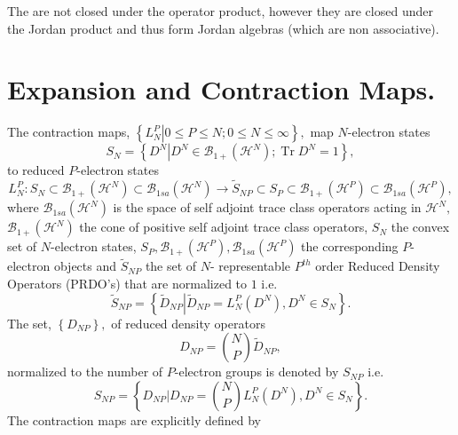 \documentclass[aps,preprint]{revtex4}%
\begin{document}
The are not closed under the operator product, however they are closed under
the Jordan product and thus form Jordan algebras (which are non associative).

\section{Expansion and Contraction Maps.}

The contraction maps, $\left\{  \left.  L_{N}^{P}\right\vert 0\leq P\leq
N;0\leq N\leq\infty\right\}  ,$ map $N$-electron states%
\begin{equation}
S_{N}=\left\{  D^{N}\left\vert D^{N}\in\mathcal{B}_{1+}\left(  \mathcal{H}%
^{N}\right)  ;\operatorname{Tr}D^{N}=1\right.  \right\}  ,
\end{equation}
to reduced $P$-electron states
\begin{equation}
L_{N}^{P}:S_{N}\subset\mathcal{B}_{1+}\left(  \mathcal{H}^{N}\right)
\subset\mathcal{B}_{1sa}\left(  \mathcal{H}^{N}\right)  \longrightarrow
\tilde{S}_{NP}\subset S_{P}\subset\mathcal{B}_{1+}\left(  \mathcal{H}%
^{P}\right)  \subset\mathcal{B}_{1sa}\left(  \mathcal{H}^{P}\right)  ,
\end{equation}
where $\mathcal{B}_{1sa}\left(  \mathcal{H}^{N}\right)  $ is the space of self
adjoint trace class operators acting in $\mathcal{H}^{N},$ $\mathcal{B}%
_{1+}\left(  \mathcal{H}^{N}\right)  $ the cone of positive self adjoint trace
class operators, $S_{N}$ the convex set of $N$-electron states, $S_{P}%
,\mathcal{B}_{1+}\left(  \mathcal{H}^{P}\right)  ,\mathcal{B}_{1sa}\left(
\mathcal{H}^{P}\right)  $ the corresponding $P$-electron objects and
$\tilde{S}_{NP}$ the set of $N$- representable $P^{th}$ order Reduced Density
Operators (PRDO's) that are normalized to $1$ i.e.
\begin{equation}
\tilde{S}_{NP}=\left\{  \left.  \tilde{D}_{NP}\right\vert \tilde{D}_{NP}%
=L_{N}^{P}\left(  D^{N}\right)  ,D^{N}\in S_{N}\right\}  .
\end{equation}
The set, $\left\{  D_{NP}\right\}  ,$ of reduced density operators
\begin{equation}
D_{NP}=\binom{N}{P}\tilde{D}_{NP},
\end{equation}
normalized to the number of $P$-electron groups is denoted by $S_{NP}$ i.e.
\begin{equation}
S_{NP}=\left\{  \left.  D_{NP}\right\vert D_{NP}=\binom{N}{P}L_{N}^{P}\left(
D^{N}\right)  ,D^{N}\in S_{N}\right\}  .
\end{equation}
The contraction maps are explicitly defined by
\end{document}
